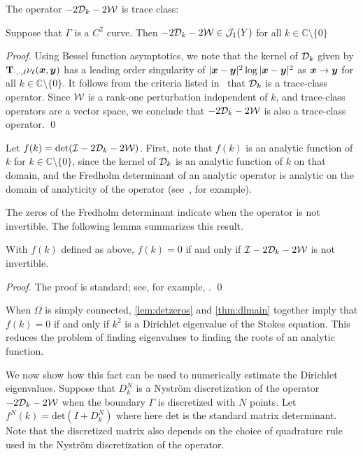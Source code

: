 
The operator $-2{\mathcal D}_{k} - 2{\mathcal W}$ is trace class:
\begin{lemma}
  Suppose that $\Gamma$ is a $C^2$ curve.
  Then $-2{\mathcal D}_{k} - 2{\mathcal W} \in {\mathcal J}_1(Y)$
  for all $k \in \mathbb{C} \setminus \{0\}$ 
\end{lemma}
\begin{proof}
Using Bessel function asymptotics, we note that the
kernel of ${\mathcal D}_{k}$ given by ${\bf T}_{\cdot,\cdot,\ell}\nu_{\ell}({\boldsymbol x},{\boldsymbol y})$
has a leading order singularity of
$|{\boldsymbol x}-{\boldsymbol y}|^2 \log{|{\boldsymbol x}-{\boldsymbol y}|^2}$ as ${\boldsymbol x}\to {\boldsymbol y}$ 
for all $k \in \mathbb{C} \setminus \{ 0\}$.
It follows from the criteria listed
in~\cite[Sec. 2]{bornemann2010numerical} that ${\mathcal D}_{k}$
is a trace-class operator.
Since ${\mathcal W}$ is a rank-one perturbation independent of $k$,
and trace-class operators are a vector space, we conclude
that $-2{\mathcal D}_{k} - 2{\mathcal W}$ is also a trace-class operator.
\qed
\end{proof}

Let $f(k) = \text{det}(\mathcal I - 2{\mathcal D}_{k} - 2{\mathcal W})$.
First, note that $f(k)$ is an analytic function of $k$
for $k \in \mathbb{C} \setminus \{0 \}$, since the kernel
of ${\mathcal D}_{k}$ is an analytic function of $k$ on that domain, 
and the Fredholm determinant of an analytic operator 
is analytic on the domain of analyticity
of the operator (see~\cite{zhao2015robust}, for example).

The zeros of the Fredholm determinant indicate when the
operator is not invertible.
The following lemma summarizes this result.
\begin{lemma} \label{lem:detzeros}
  With $f(k)$ defined as above, $f(k) = 0$ if and only if
  $\mathcal I - 2{\mathcal D}_{k} -2{\mathcal W}$ is not invertible.
\end{lemma}
\begin{proof}
  The proof is standard; see, for example,
  \cite[p. 34]{simon2005trace}.
\qed
\end{proof}

When $\Omega$ is simply connected, \cref{lem:detzeros} and 
\cref{thm:dlmain} together imply that $f(k) = 0$
if and only if $k^2$ 
is a Dirichlet eigenvalue of the Stokes equation.
This reduces the problem of finding eigenvalues to
finding the roots of an analytic function.

We now show how this fact can be used to numerically
estimate the Dirichlet eigenvalues.
Suppose that $D_{k}^{N}$ is a Nystr\"{o}m discretization 
of the operator $-2{\mathcal D}_{k} - 2{\mathcal W}$ when the boundary 
$\Gamma$ is discretized with $N$ points. 
Let $f^{N}(k) = \text{det}(I + D_{k}^{N})$
where here $\text{det}$ is the standard matrix determinant.
Note that the discretized matrix also depends on the choice
of quadrature rule used in the Nystr\"{o}m discretization
of the operator.


